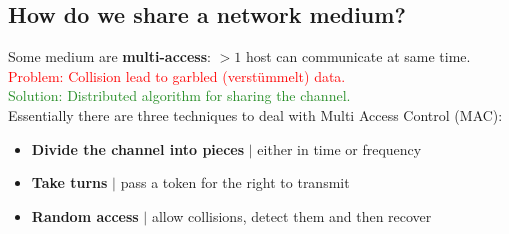 \documentclass[a4paper, fontsize=8pt, landscape, DIV=1]{scrartcl}
\begin{document}
\begin{multicols*}{4}
   			\subsection{How do we share a network medium?}
   			Some medium are \textbf{multi-access}: $>1$ host can communicate at same time.\\
   			\textcolor{Red}{Problem: Collision lead to garbled (verstümmelt) data.}\\
   			\textcolor{ForestGreen}{Solution: Distributed algorithm for sharing the channel.}\\
   			Essentially there are three techniques to deal with Multi Access Control (MAC):
   			\begin{itemize}[noitemsep]
   				\item \textbf{Divide the channel into pieces} $\vert$ either in time or frequency
   				\item \textbf{Take turns} $\vert$ pass a token for the right to transmit
   				\item \textbf{Random access} $\vert$ allow collisions, detect them and then recover
   			\end{itemize} 
   			

\end{multicols*}
\end{document}
